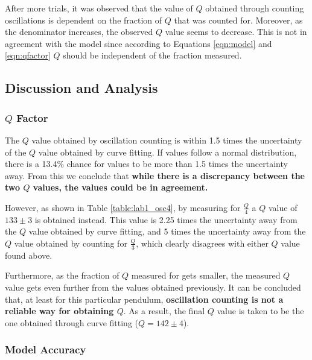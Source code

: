 \documentclass[aps,twocolumn,secnumarabic,nobalancelastpage,amsmath,amssymb,nofootinbib,floatfix,letterpaper]{revtex4}
\begin{document}
After more trials, it was observed that the value of \(Q\) obtained through counting oscillations is dependent on the
fraction of \(Q\) that was counted for. Moreover, as the denominator increases, the observed \(Q\) value seems to
decrease. This is not in agreement with the model since according to Equations \ref{eqn:model} and \ref{eqn:qfactor}
\(Q\) should be independent of the fraction measured.

\subsection{Discussion and Analysis}
\label{sec:lab1_analysis}

\subsubsection{\texorpdfstring{\(Q\)}{Q} Factor}
\label{sec:lab1_qfactor}

The \(Q\) value obtained by oscillation counting is within 1.5 times the uncertainty of the \(Q\) value obtained by
curve fitting. If values follow a normal distribution, there is a 13.4\% chance for values to be more than 1.5 times the
uncertainty away. From this we conclude that \textbf{while there is a discrepancy between the two \(Q\) values, the
values could be in agreement.}

However, as shown in Table \ref{table:lab1_osc4}, by measuring for \(\frac{Q}{4}\) a \(Q\) value of \(133 \pm 3\) is
obtained instead. This value is 2.25 times the uncertainty away from the \(Q\) value obtained by curve fitting, and 5
times the uncertainty away from the \(Q\) value obtained by counting for \(\frac{Q}{3}\), which clearly disagrees with
either \(Q\) value found above.

Furthermore, as the fraction of \(Q\) measured for gets smaller, the measured \(Q\) value gets even further from the
values obtained previously. It can be concluded that, at least for this particular pendulum, \textbf{oscillation
counting is not a reliable way for obtaining \(Q\)}. As a result, the final \(Q\) value is taken to be the one obtained
through curve fitting (\(Q = 142 \pm 4\)).

\subsubsection{Model Accuracy}
\end{document}
